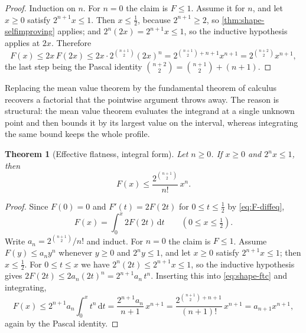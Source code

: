 \documentclass[11pt,oneside]{article}
\newtheorem{theorem}{Theorem}[section]
\theoremstyle{definition}
\theoremstyle{remark}
\newcommand{\dd}{\,\mathrm d}
\begin{document}
\begin{proof}
Induction on $n$.  For $n=0$ the claim is $F\le1$.  Assume it for $n$, and let $x\ge0$ satisfy
$2^{n+1}x\le1$.  Then $x\le\tfrac12$, because $2^{n+1}\ge2$, so
\cref{thm:shape-selfimproving} applies; and $2^{n}(2x)=2^{n+1}x\le1$, so the inductive
hypothesis applies at $2x$.  Therefore
\[
 F(x)\le2x\,F(2x)\le2x\cdot2^{\binom{n+1}{2}}(2x)^{n}
 =2^{\binom{n+1}{2}+n+1}x^{n+1}=2^{\binom{n+2}{2}}x^{n+1},
\]
the last step being the Pascal identity $\binom{n+2}{2}=\binom{n+1}{2}+(n+1)$.
\end{proof}

Replacing the mean value theorem by the fundamental theorem of calculus recovers a factorial
that the pointwise argument throws away.  The reason is structural: the mean value theorem
evaluates the integrand at a single unknown point and then bounds it by its largest value on
the interval, whereas integrating the same bound keeps the whole profile.

\begin{theorem}[Effective flatness, integral form]
\label{thm:shape-flatness-ftc}
Let $n\ge0$.  If $x\ge0$ and $2^nx\le1$, then
\begin{equation}
 F(x)\le\frac{2^{\binom{n+1}{2}}}{n!}\,x^{n}.             \label{eq:shape-flatness-ftc}
\end{equation}
\end{theorem}

\begin{proof}
Since $F(0)=0$ and $F'(t)=2F(2t)$ for $0\le t\le\tfrac12$ by \eqref{eq:F-diffeq},
\begin{equation}
 F(x)=\int_0^x2F(2t)\dd t\qquad(0\le x\le\tfrac12).       \label{eq:shape-ftc}
\end{equation}
Write $a_n=2^{\binom{n+1}{2}}/n!$ and induct.  For $n=0$ the claim is $F\le1$.  Assume
$F(y)\le a_ny^{n}$ whenever $y\ge0$ and $2^ny\le1$, and let $x\ge0$ satisfy $2^{n+1}x\le1$;
then $x\le\tfrac12$.  For $0\le t\le x$ we have $2^{n}(2t)\le2^{n+1}x\le1$, so the inductive
hypothesis gives $2F(2t)\le2a_n(2t)^{n}=2^{n+1}a_n\,t^{n}$.  Inserting this into
\eqref{eq:shape-ftc} and integrating,
\[
 F(x)\le2^{n+1}a_n\int_0^xt^{n}\dd t=\frac{2^{n+1}a_n}{n+1}\,x^{n+1}
 =\frac{2^{\binom{n+1}{2}+n+1}}{(n+1)!}\,x^{n+1}
 =a_{n+1}x^{n+1},
\]
again by the Pascal identity.
\end{proof}
\end{document}

